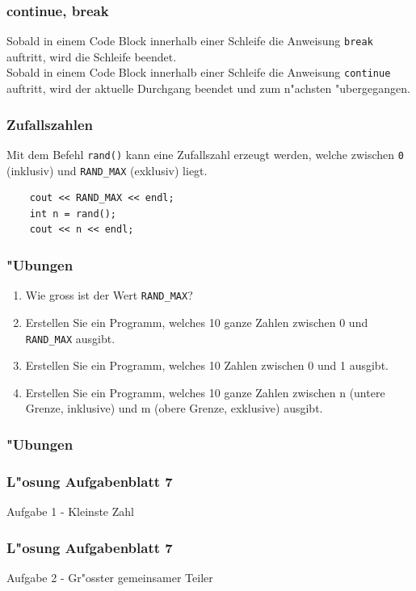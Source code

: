 \documentclass{beamer}
\begin{document}
\begin{frame}[fragile]
	\frametitle{continue, break}
	Sobald in einem Code Block innerhalb einer Schleife die Anweisung \verb|break|
	auftritt, wird die Schleife beendet.\\
	Sobald in einem Code Block innerhalb einer Schleife die Anweisung \verb|continue|
	auftritt, wird der aktuelle Durchgang beendet und zum n"achsten "ubergegangen.\\
\end{frame}

\begin{frame}[fragile]
	\frametitle{Zufallszahlen}
	Mit dem Befehl \verb|rand()| kann eine Zufallszahl erzeugt werden, welche
	zwischen \verb|0| (inklusiv) und \verb|RAND_MAX| (exklusiv) liegt.
	\begin{lstlisting}
	cout << RAND_MAX << endl;
	int n = rand();
	cout << n << endl;
	\end{lstlisting}
\end{frame}

\begin{frame}[fragile]
	\frametitle{"Ubungen}
	\begin{enumerate}
	\item Wie gross ist der Wert \verb|RAND_MAX|?
	\item Erstellen Sie ein Programm, welches 10 ganze Zahlen zwischen 0 und \verb|RAND_MAX| ausgibt.
	\item Erstellen Sie ein Programm, welches 10 Zahlen zwischen 0 und 1 ausgibt.
	\item Erstellen Sie ein Programm, welches 10 ganze Zahlen zwischen n (untere Grenze, inklusive) und m (obere Grenze, exklusive) ausgibt.
	\end{enumerate}
\end{frame}

\begin{frame}[fragile]
	\frametitle{"Ubungen}
	{\tiny
	
	}
\end{frame}

\begin{frame}[fragile]
	\frametitle{L"osung Aufgabenblatt 7}
	Aufgabe 1 - Kleinste Zahl
	{\tiny
	
	}
\end{frame}

\begin{frame}[fragile]
	\frametitle{L"osung Aufgabenblatt 7}
	Aufgabe 2 - Gr"osster gemeinsamer Teiler
	{\tiny
	
	}
\end{frame}
\end{document}
